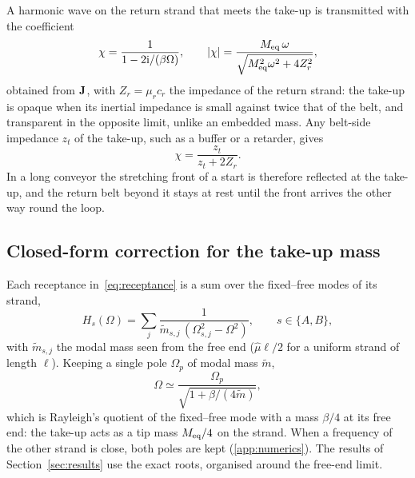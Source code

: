 A harmonic wave on the return strand that meets the take-up is transmitted with the
coefficient
\begin{equation}\label{eq:transmission}
  \chi=\frac{1}{1-2\mathrm{i}/(\beta\Omega)},\qquad
  |\chi|=\frac{M_{\mathrm{eq}}\,\omega}{\sqrt{M_{\mathrm{eq}}^2\omega^2+4Z_r^2}},
\end{equation}
obtained from $\mathbf{J}$, with $Z_r=\mu_rc_r$ the impedance of the return strand: the take-up is
opaque when its inertial impedance is small against twice that of the belt, and transparent in
the opposite limit, unlike an embedded mass. Any belt-side impedance $z_t$ of the take-up, such
as a buffer or a retarder, gives
\begin{equation}\label{eq:transmission_z}
  \chi=\frac{z_t}{z_t+2Z_r} .
\end{equation}
In a long conveyor the stretching front of a start is therefore reflected at the take-up, and
the return belt beyond it stays at rest until the front arrives the other way round the loop.

\subsection{Closed-form correction for the take-up mass}\label{sec:masscorrection}

Each receptance in~\eqref{eq:receptance} is a sum over the fixed--free modes of its strand,
\begin{equation}\label{eq:receptance_sum}
  H_s(\Omega)=\sum_j\frac{1}{\tilde m_{s,j}\,(\Omega_{s,j}^2-\Omega^2)},\qquad s\in\{A,B\},
\end{equation}
with $\tilde m_{s,j}$ the modal mass seen from the free end ($\hat\mu\ell/2$ for a uniform
strand of length $\ell$). Keeping a single pole $\Omega_p$ of modal mass $\tilde m$,
\begin{equation}\label{eq:onepole}
  \Omega\simeq\frac{\Omega_p}{\sqrt{1+\beta/(4\tilde m)}},
\end{equation}
which is Rayleigh's quotient of the fixed--free mode with a mass $\beta/4$ at its free end:
the take-up acts as a tip mass $M_{\mathrm{eq}}/4$ on the strand. When a frequency of the
other strand is close, both poles are kept (\cref{app:numerics}). The results of Section~\ref{sec:results} use the exact roots, organised around the free-end
limit.

